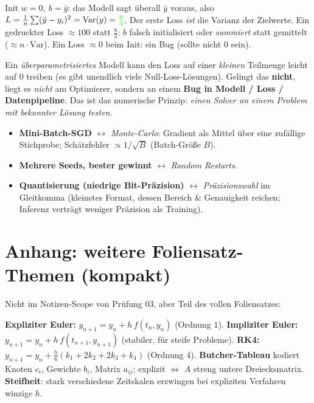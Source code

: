 \documentclass[a4paper,11pt]{article}
\newcommand{\f}[1]{\textcolor{green}{#1}}
\begin{document}
\begin{beispiel}[Erster Loss $=$ Varianz]
Init $w=0,\ b=\bar y$: das Modell sagt überall $\bar y$ voraus, also
$L=\tfrac1n\sum(\bar y-y_i)^2=\mathrm{Var}(y)=\f{\tfrac83}$. Der erste Loss \emph{ist} die Varianz der
Zielwerte. \;
Ein gedruckter Loss $\approx100$ statt $\tfrac83$: $b$ falsch initialisiert oder \emph{summiert}
statt gemittelt ($\approx n\cdot\mathrm{Var}$). Ein Loss $\approx0$ beim Init: ein Bug (sollte nicht $0$
sein).
\end{beispiel}

\begin{formel}
Ein \emph{überparametrisiertes} Modell kann den Loss auf einer \emph{kleinen} Teilmenge leicht auf $0$
treiben (es gibt unendlich viele Null-Loss-Lösungen). Gelingt das \textbf{nicht}, liegt es \emph{nicht}
am Optimierer, sondern an einem \textbf{Bug in Modell / Loss / Datenpipeline}. Das ist das numerische
Prinzip: \emph{einen Solver an einem Problem mit bekannter Lösung testen}.
\end{formel}

\begin{merke}
\begin{itemize}[leftmargin=1.4em,nosep]
\item \textbf{Mini-Batch-SGD} $\leftrightarrow$ \emph{Monte-Carlo}: Gradient als Mittel über eine
      zufällige Stichprobe; Schätzfehler $\propto 1/\sqrt{B}$ (Batch-Größe $B$).
\item \textbf{Mehrere Seeds, bester gewinnt} $\leftrightarrow$ \emph{Random Restarts}.
\item \textbf{Quantisierung (niedrige Bit-Präzision)} $\leftrightarrow$ \emph{Präzisionswahl} im
      Gleitkomma (kleinstes Format, dessen Bereich \& Genauigkeit reichen; Inferenz verträgt weniger
      Präzision als Training).
\end{itemize}
\end{merke}

\section{Anhang: weitere Foliensatz-Themen (kompakt)}
Nicht im Notizen-Scope von Prüfung 03, aber Teil des vollen Foliensatzes:

\begin{formel}
\textbf{Expliziter Euler:} $y_{n+1}=y_n+h\,f(t_n,y_n)$ (Ordnung $1$). \;
\textbf{Impliziter Euler:} $y_{n+1}=y_n+h\,f(t_{n+1},y_{n+1})$ (stabiler, für steife Probleme). \;
\textbf{RK4:} $y_{n+1}=y_n+\tfrac h6(k_1+2k_2+2k_3+k_4)$ (Ordnung $4$). \;
\textbf{Butcher-Tableau} kodiert Knoten $c_i$, Gewichte $b_i$, Matrix $a_{ij}$; explizit $\Leftrightarrow$
$A$ streng untere Dreiecksmatrix. \textbf{Steifheit}: stark verschiedene Zeitskalen erzwingen bei
expliziten Verfahren winzige $h$.
\end{formel}
\end{document}
